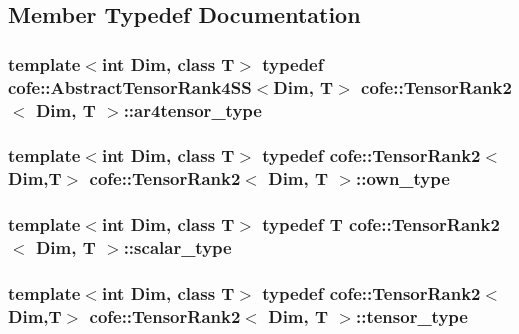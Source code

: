 \subsection{Member Typedef Documentation}
\hypertarget{classcofe_1_1TensorRank2_ae3f28ba9fd3ccd7afe9c5976b6e5178b}{
\subsubsection[{ar4tensor\-\_\-type}]{\setlength{\rightskip}{0pt plus 5cm}template$<$int Dim, class T$>$ typedef {\bf cofe\-::\-Abstract\-Tensor\-Rank4\-S\-S}$<$Dim, T$>$ {\bf cofe\-::\-Tensor\-Rank2}$<$ Dim, T $>$\-::{\bf ar4tensor\-\_\-type}}}\label{classcofe_1_1TensorRank2_ae3f28ba9fd3ccd7afe9c5976b6e5178b}
\hypertarget{classcofe_1_1TensorRank2_afef4f2c69f8a804d795c334bc382dc5f}{
\subsubsection[{own\-\_\-type}]{\setlength{\rightskip}{0pt plus 5cm}template$<$int Dim, class T$>$ typedef {\bf cofe\-::\-Tensor\-Rank2}$<$Dim,T$>$ {\bf cofe\-::\-Tensor\-Rank2}$<$ Dim, T $>$\-::{\bf own\-\_\-type}}}\label{classcofe_1_1TensorRank2_afef4f2c69f8a804d795c334bc382dc5f}
\hypertarget{classcofe_1_1TensorRank2_a3dce726b0c34912c6549a5911f478eaf}{
\subsubsection[{scalar\-\_\-type}]{\setlength{\rightskip}{0pt plus 5cm}template$<$int Dim, class T$>$ typedef T {\bf cofe\-::\-Tensor\-Rank2}$<$ Dim, T $>$\-::{\bf scalar\-\_\-type}}}\label{classcofe_1_1TensorRank2_a3dce726b0c34912c6549a5911f478eaf}
\hypertarget{classcofe_1_1TensorRank2_a3af9468088af4836c93808edaceb03b0}{
\subsubsection[{tensor\-\_\-type}]{\setlength{\rightskip}{0pt plus 5cm}template$<$int Dim, class T$>$ typedef {\bf cofe\-::\-Tensor\-Rank2}$<$Dim,T$>$ {\bf cofe\-::\-Tensor\-Rank2}$<$ Dim, T $>$\-::{\bf tensor\-\_\-type}}}\label{classcofe_1_1TensorRank2_a3af9468088af4836c93808edaceb03b0}
